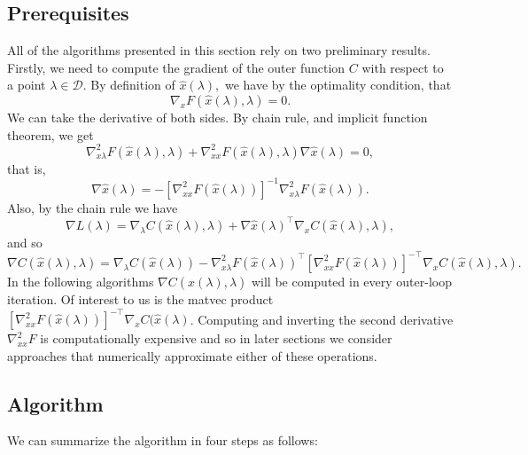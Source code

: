 \documentclass[11pt, twoside]{report}
\begin{document}
\subsection{Prerequisites}
All of the algorithms presented in this section rely on two preliminary results. Firstly, we need to compute the gradient of the outer function $C$ with respect to a point $\lambda \in \mathcal{D}$. By definition of $\hat{x}(\lambda),$ we have by the optimality condition, that
\begin{equation} \label{opt_cond_smooth}
    \nabla_x F(\hat{x}(\lambda),\lambda) = 0.
\end{equation}
We can take the derivative of both sides. By chain rule, and implicit function theorem, we get
\begin{equation} \label{ift_opt}
    \nabla^2_{x\lambda} F(\hat{x}(\lambda),\lambda) + \nabla^2_{xx} F(\hat{x}(\lambda),\lambda) \nabla \hat{x}(\lambda) = 0,
\end{equation}
that is, 
\[\nabla \hat{x}(\lambda) = -\left[ \nabla^2_{xx} F(\hat{x}(\lambda)) \right]^{-1}\nabla^2_{x \lambda} F(\hat{x}(\lambda)).\]
Also, by the chain rule we have
\[\nabla L(\lambda) = \nabla_\lambda C(\hat{x}(\lambda), \lambda) + \nabla \hat{x}(\lambda)^\top \nabla_x C(\hat{x}(\lambda), \lambda),\]
and so
\[\nabla C(\hat{x}(\lambda), \lambda) = \nabla_\lambda C(\hat{x}(\lambda)) - \nabla^2_{x \lambda} F(\hat{x}(\lambda))^\top \left[ \nabla^2_{xx} F(\hat{x}(\lambda)) \right]^{-\top} \nabla_x C(\hat{x}(\lambda), \lambda).\]
In the following algorithms $\nabla C(\hat{x}(\lambda), \lambda)$ will be computed in every outer-loop iteration. Of interest to us is the matvec product $\left[ \nabla^2_{xx} F(\hat{x}(\lambda)) \right]^{-\top} \nabla_x C(\hat{x}(\lambda)$. Computing and inverting the second derivative $\nabla^2_{xx} F$ is computationally expensive and so in later sections we consider approaches that numerically approximate either of these operations.
\subsection{Algorithm}
We can summarize the algorithm in four steps as follows:
\end{document}
